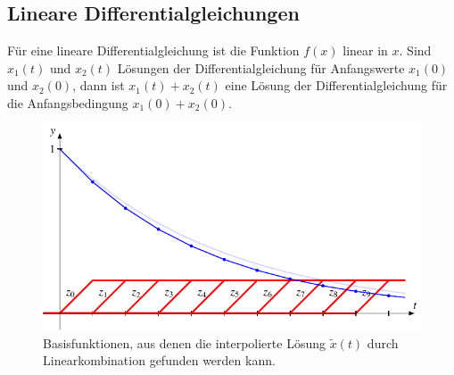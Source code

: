 %
%
%
\subsection{Lineare Differentialgleichungen\label{subsection:lindgl}}
Für eine lineare Differentialgleichung ist die Funktion $f(x)$ linear
in $x$.
Sind $x_1(t)$ und $x_2(t)$ Lösungen der Differentialgleichung
für Anfangswerte $x_1(0)$ und $x_2(0)$, dann ist
$x_1(t)+x_2(t)$ eine Lösung der Differentialgleichung für die
Anfangsbedingung $x_1(0)+x_2(0)$.

\begin{figure}
\centering
\includegraphics{chapters/3/slopes.pdf}
\caption{Basisfunktionen, aus denen die interpolierte Lösung $\tilde{x}(t)$
durch Linearkombination gefunden werden kann.
\label{skript:elemente:slopes}}
\end{figure}

